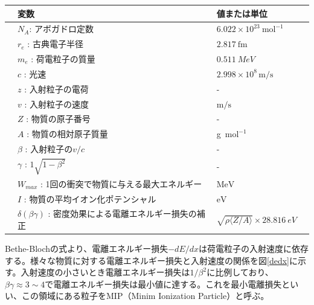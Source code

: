\begin{table}[H]
 \label{table:bethe}
 \centering
  \begin{tabular}{clll}
   \hline \hline
   &変数 & 値または単位 \\
   \hline
&$N_A $: アボガドロ定数 & $6.022 \times 10^{23}\: {\si{\mol}}^{-1}$\\
&$r_e$ : 古典電子半径&$2.817\: \mathrm{fm}$\\ 
&$m_e$ : 荷電粒子の質量 &$\SI{0.511}{MeV}$\\
&$c$ : 光速 & $2.998 \times 10^8 \, \mathrm{m/s}$\\
&$z$ : 入射粒子の電荷& - \\
&$v$ : 入射粒子の速度& $\mathrm{m/s}$\\
&$Z$ : 物質の原子番号 & - \\
&$A$ : 物質の相対原子質量 & g\ ${\si{\mol}}^{-1}$ \\
&$\beta$ : 入射粒子の$v/c$ & - \\
&$\gamma$ : $1\sqrt{1-{\beta}^2}$ & - \\
&$W_{max}$ : 1回の衝突で物質に与える最大エネルギー & $\mathrm{MeV}$\\
&$I$ : 物質の平均イオン化ポテンシャル &$\mathrm{eV}$\\
&$\delta(\beta \gamma)$ : 密度効果による電離エネルギー損失の補正 & $\sqrt{\rho \langle Z/A\rangle } \times \SI{28.816}{eV}$\\
 \hline
  \end{tabular}
\end{table}
Bethe-Blochの式より、電離エネルギー損失$-dE/dx$は荷電粒子の入射速度に依存する。様々な物質に対する電離エネルギー損失と入射速度の関係を図\ref{dedx}に示す。入射速度の小さいとき電離エネルギー損失は$1/{\beta}^2$に比例しており、$\beta \gamma  \approx 3 \sim 4$で電離エネルギー損失は最小値に達する。これを最小電離損失といい、この領域にある粒子をMIP（Minim Ionization Particle）と呼ぶ。

\clearpage

